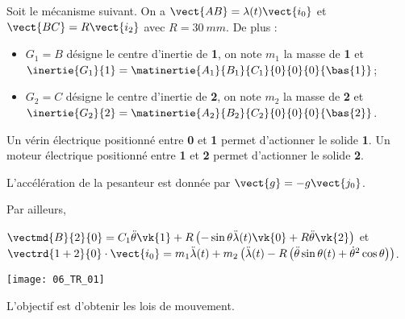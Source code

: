 \normaltrue
\correctionfalse


\setcounter{question}{0}%

\ifcorrection
\else
{}
\fi

\ifprof
\else
Soit le mécanisme suivant. On a $\vect{AB}=\lambda(t)\vect{i_0}$ et $\vect{BC}=R\vect{i_2}$ avec $R=\SI{30}{mm}$.
De plus :
\begin{itemize}
\item $G_1=B$ désigne le centre d'inertie de \textbf{1}, on note $m_1$ la masse de \textbf{1} et $\inertie{G_1}{1}=\matinertie{A_1}{B_1}{C_1}{0}{0}{0}{\bas{1}}$; 
\item $G_2=C$ désigne le centre d'inertie de \textbf{2}, on note $m_2$ la masse de \textbf{2} et $\inertie{G_2}{2}=\matinertie{A_2}{B_2}{C_2}{0}{0}{0}{\bas{2}}$.
\end{itemize}

Un vérin électrique positionné entre \textbf{0} et \textbf{1}  permet d'actionner le solide \textbf{1}.
Un moteur électrique positionné entre \textbf{1} et \textbf{2}  permet d'actionner le solide \textbf{2}.

L'accélération de la pesanteur est donnée par $\vect{g}=-g\vect{j_0}$.

Par ailleurs,  

\noindent $\vectmd{B}{2}{0} = C_1  \ddot{\theta} \vk{1} + R\left( -\sin \theta \ddot{\lambda}(t) \vk{0} 
+ R \ddot{\theta} \vk{2}\right)$
et $\vectrd{1+2}{0}\cdot \vect{i_0}=m_1\ddot{\lambda}(t)+m_2\left(\ddot{\lambda}(t)- R \left(\ddot{\theta} \sin\theta(t)  + \dot{\theta}^2 \cos\theta \right)\right)$. 
\begin{marginfigure}
\texttt{[image: 06\_TR\_01]}
\end{marginfigure}
\fi

L'objectif est d'obtenir les lois de mouvement. 

